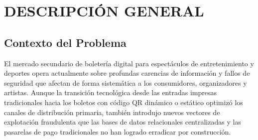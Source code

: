 \newpage
\section{DESCRIPCIÓN GENERAL}


\subsection{Contexto del Problema}

El mercado secundario de boletería digital para espectáculos de entretenimiento y deportes opera actualmente
sobre profundas carencias 
de información y fallos de seguridad que afectan de forma sistemática a los consumidores, organizadores y
artistas. 
Aunque la transición tecnológica desde las entradas impresas tradicionales hacia los boletos con código QR
dinámico o estático 
optimizó los canales de distribución primaria, también introdujo nuevos vectores de explotación fraudulenta
que las bases de datos 
relacionales centralizadas y las pasarelas de pago tradicionales no han logrado erradicar por construcción.

